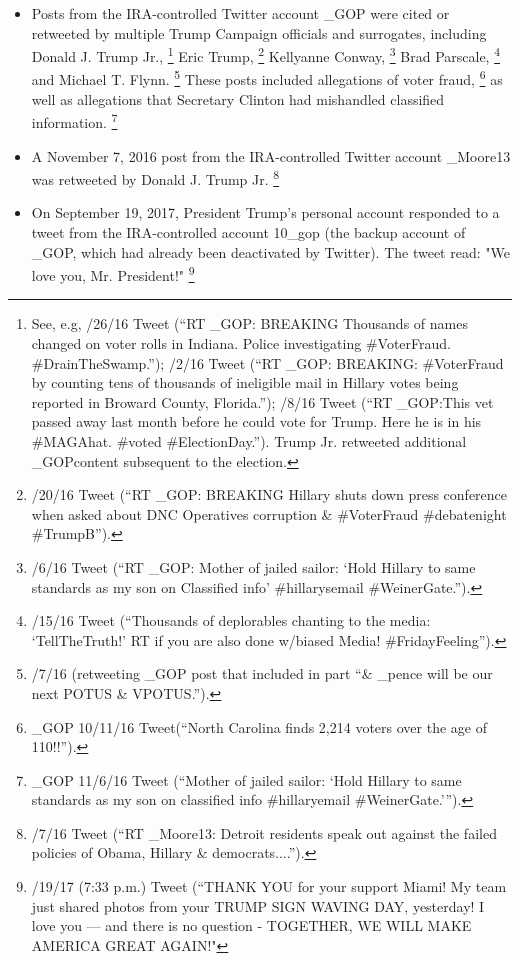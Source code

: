 \begin{itemize}
    \item Posts from the IRA-controlled Twitter account \@TEN\_GOP were cited or retweeted by multiple Trump Campaign officials and surrogates, including Donald J. Trump Jr.,%
    \footnote{See, e.g, /26/16 Tweet (“RT \@TEN\_GOP: BREAKING Thousands of names changed on voter rolls in Indiana.
    Police investigating \#VoterFraud. \#DrainTheSwamp.”);
    /2/16 Tweet (“RT \@TEN\_GOP: BREAKING: \#VoterFraud by counting tens of thousands of ineligible mail in Hillary votes being reported in Broward County, Florida.”);
    /8/16 Tweet (“RT \@TEN\_GOP:This vet passed away last month before he could vote for Trump.
    Here he is in his \#MAGAhat.
    \#voted \#ElectionDay.”). Trump Jr. retweeted additional \@TEN\_GOPcontent subsequent to the election.}
    Eric Trump,%
    \footnote{/20/16 Tweet (“RT \@TEN\_GOP: BREAKING Hillary shuts down press conference when asked about DNC Operatives corruption \& \#VoterFraud \#debatenight \#TrumpB”).}
    Kellyanne Conway,%
    \footnote{/6/16 Tweet (“RT \@TEN\_GOP: Mother of jailed sailor: ‘Hold Hillary to same standards as my son on Classified info' \#hillarysemail \#WeinerGate.”).}
    Brad Parscale,%
    \footnote{/15/16 Tweet (“Thousands of deplorables chanting to the media: ‘TellTheTruth!' RT if you are also done w/biased Media! \#FridayFeeling”).}
    and Michael T. Flynn.%
    \footnote{/7/16 (retweeting \@TEN\_GOP post that included in part “\@realDonaldTrump \& \@mike\_pence will be our next POTUS \& VPOTUS.”).}
    These posts included allegations of voter fraud,%
    \footnote{\@TEN\_GOP 10/11/16 Tweet(“North Carolina finds 2,214 voters over the age of 110!!”).}
    as well as allegations that Secretary Clinton had mishandled classified information.%
    \footnote{\@TEN\_GOP 11/6/16 Tweet (“Mother of jailed sailor: ‘Hold Hillary to same standards as my son on classified info \#hillaryemail \#WeinerGate.'”).}
    \item A November 7, 2016 post from the IRA-controlled Twitter account \@Pamela\_Moore13 was retweeted by Donald J. Trump Jr.%
    \footnote{/7/16 Tweet (“RT \@Pamela\_Moore13: Detroit residents speak out against the failed policies of Obama, Hillary \& democrats....”).}
    \item On September 19, 2017, President Trump's personal account \@realDonaldTrump responded to a tweet from the IRA-controlled account \@10\_gop (the backup account of \@TEN\_GOP, which had already been deactivated by Twitter). The tweet read: "We love you, Mr. President!"%
    \footnote{/19/17 (7:33 p.m.) Tweet (“THANK YOU for your support Miami! My team just shared photos from your TRUMP SIGN WAVING DAY, yesterday! I love you — and there is no question - TOGETHER, WE WILL MAKE AMERICA GREAT AGAIN!"}
\end{itemize}


